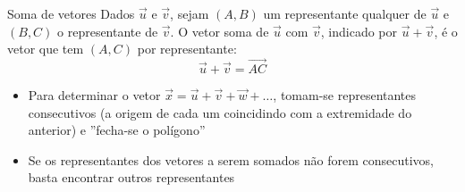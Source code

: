 \begin{frame}{Soma de vetores}
    Dados \(\vec{u}\) e \(\vec{v}\), sejam \((A,B)\) um representante qualquer de \(\vec{u}\) e \((B,C)\) o representante
    de \(\vec{v}\). O vetor soma de \(\vec{u}\) com \(\vec{v}\), indicado por \(\vec{u}+\vec{v}\), é o vetor que tem \((A,C)\)
    por representante:
    \[
        \vec{u}+\vec{v}=\vec{AC}
    \]
    \begin{center}
    \end{center}

     {
        \begin{itemize}
            \item Para determinar o vetor \(\vec{x}=\vec{u}+\vec{v}+\vec{w}+\ldots\), tomam-se representantes consecutivos 
                (a origem de cada um coincidindo com a extremidade do anterior) e ''fecha-se o polígono''
            \item Se os representantes dos vetores a serem somados não forem consecutivos, basta encontrar 
                outros representantes
        \end{itemize}
    }
\end{frame}

